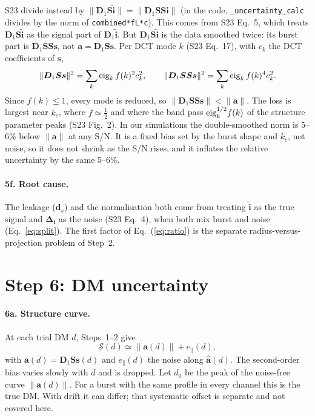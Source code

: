 \documentclass[11pt]{article}
\newcommand{\vb}[1]{\boldsymbol{#1}}
\newcommand{\Dn}{\vb D_1}
\newcommand{\Sm}{\vb S}
\newcommand{\ti}{\tilde{\vb i}}
\newcommand{\Di}{\vb\Delta_{\vb i}}
\newcommand{\ah}{\hat{\vb a}}
\newcommand{\nrm}[1]{\lVert #1\rVert}
\newcommand{\na}{\nrm{\vb a}}
\newcommand{\Sc}{\mathcal S}
\newcommand{\ep}{e_\parallel}
\begin{document}
S23 divide instead by $\nrm{\Dn\Sm\ti}=\nrm{\Dn\Sm\Sm\vb i}$ (in the code, \texttt{\_uncertainty\_calc} divides by
the norm of \texttt{combined*fL*c}). This comes from S23 Eq.~5, which treats $\Dn\Sm\ti$ as the signal part of
$\Dn\ti$. But $\Dn\Sm\ti$ is the data smoothed twice: its burst part is $\Dn\Sm\Sm\vb s$, not $\vb a=\Dn\Sm\vb s$.
Per DCT mode $k$ (S23 Eq.~17), with $c_k$ the DCT coefficients of $\vb s$,
\begin{equation}
\nrm{\Dn\Sm\vb s}^{2}=\sum_k{\rm eig}_k\,f(k)^{2}c_k^{2},\qquad
\nrm{\Dn\Sm\Sm\vb s}^{2}=\sum_k{\rm eig}_k\,f(k)^{4}c_k^{2}.
\end{equation}
Since $f(k)\le1$, every mode is reduced, so $\nrm{\Dn\Sm\Sm\vb s}<\na$. The loss is largest near $k_c$, where
$f\simeq\tfrac12$ and where the band pass ${\rm eig}_k^{1/2}f(k)$ of the structure parameter peaks (S23 Fig.~2). In
our simulations the double-smoothed norm is 5--6\% below $\na$ at any S/N. It is a fixed bias set by the burst shape
and $k_c$, not noise, so it does not shrink as the S/N rises, and it inflates the relative uncertainty by the same
5--6\%.

\paragraph{5f. Root cause.}
The leakage ($\vb d_s$) and the normalisation both come from treating $\ti$ as the true signal and $\Di$ as the
noise (S23 Eq.~4), when both mix burst and noise (Eq.~\ref{eq:split}).
The first factor of Eq.~(\ref{eq:ratio}) is the separate radius-versus-projection problem of Step~2.

\section*{Step 6: DM uncertainty}

\paragraph{6a. Structure curve.}
At each trial DM $d$, Steps~1--2 give
\begin{equation}
\Sc(d)\simeq\nrm{\vb a(d)}+\ep(d),
\end{equation}
with $\vb a(d)=\Dn\Sm\vb s(d)$ and $\ep(d)$ the noise along $\ah(d)$. The second-order bias varies slowly with $d$
and is dropped. Let $d_0$ be the peak of the noise-free curve $\nrm{\vb a(d)}$. For a burst with the same profile
in every channel this is the true DM. With drift it can differ; that systematic offset is separate and not
covered here.
\end{document}
